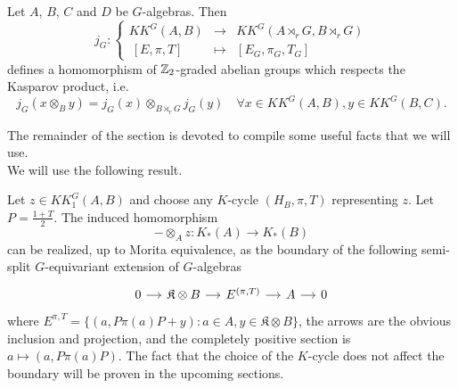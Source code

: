 \begin{prop}\cite{LeGall} Let $A$, $B$, $C$ and $D$ be $G$-algebras. Then 
\[j_G : 
\left\{\begin{array}{rcl} 
KK^G(A,B) & \rightarrow & KK^G(A\rtimes_r G,B\rtimes_r G) \\ 
\ [E,\pi,T] & \mapsto     & [E_G,\pi_G,T_G]
\end{array}\right. \] 
defines a homomorphism of $\mathbb Z_2$-graded abelian groups which respects the Kasparov product, i.e. 
\[j_G(x\otimes_B y) = j_G(x)\otimes_{B\rtimes_r G} j_G(y)\quad \forall x\in KK^G(A,B),y\in KK^G(B,C).\]
\end{prop}

The remainder of the section is devoted to compile some useful facts that we will use.\\

We will use the following result.\cite{blackadar}\cite{CuSk}


\begin{prop}
Let $z\in KK^G_1(A,B)$ and choose any $K$-cycle $(H_B,\pi,T)$ representing $z$. Let $P=\frac{1+T}{2}$. The induced homomorphism 
\[-\otimes_A z : K_*(A)\rightarrow K_*(B)\]
can be realized, up to Morita equivalence, as the boundary of the following semi-split $G$-equivariant extension of $G$-algebras
\[\begin{tikzcd}[column sep = small] 
0 \arrow{r}& \mathfrak K \otimes B \arrow{r} & E^{(\pi,T)} \arrow{r} & A \arrow{r} & 0\end{tikzcd}\]
where $E^{\pi,T}=\{(a,P\pi(a)P +y) : a\in A , y\in \mathfrak K \otimes B\}$, the arrows are the obvious inclusion and projection, and the completely positive section is $a\mapsto (a, P \pi(a) P)$. The fact that the choice of the $K$-cycle does not affect the boundary will be proven in the upcoming sections. 
\end{prop}


